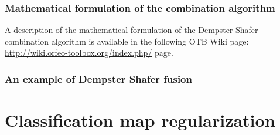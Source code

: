 \subsubsection{Mathematical formulation of the combination algorithm}

A description of the mathematical formulation of the Dempster Shafer combination 
algorithm is available in the following OTB Wiki page:
\href{http://wiki.orfeo-toolbox.org/index.php/Information_fusion_framework}{http://wiki.orfeo-toolbox.org/index.php/} page.

\subsubsection{An example of Dempster Shafer fusion}
\ifitkFullVersion

\fi



\section{Classification map regularization}


\ifitkFullVersion

\fi



